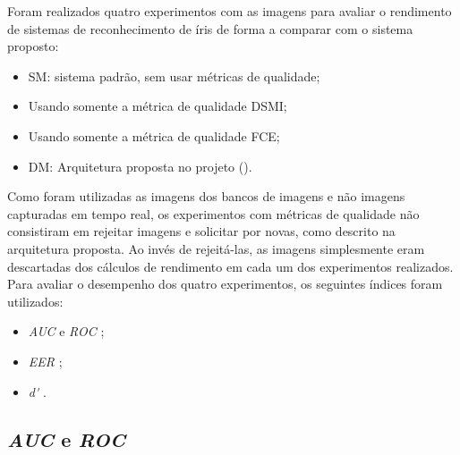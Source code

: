 

\par Foram realizados quatro experimentos com as imagens para avaliar o rendimento de sistemas de reconhecimento de íris de forma a comparar com o sistema proposto:

\begin{itemize}
    \item \acrfull{SM}: sistema padrão, sem usar métricas de qualidade;
    \item Usando somente a métrica de qualidade DSMI;
    \item Usando somente a métrica de qualidade FCE;
    \item \acrfull{DM}: Arquitetura proposta no projeto ().
\end{itemize}

\noindent Como foram utilizadas as imagens dos bancos de imagens e não imagens capturadas em tempo real, os experimentos com métricas de qualidade não consistiram em rejeitar imagens e solicitar por novas, como descrito na arquitetura proposta. Ao invés de rejeitá-las, as imagens simplesmente eram descartadas dos cálculos de rendimento em cada um dos experimentos realizados. Para avaliar o desempenho dos quatro experimentos, os seguintes índices foram utilizados:

\begin{itemize}
    \item \textit{\acrfull{AUC}} e \textit{\acrfull{ROC}} \cite{d33BEAT, aucROC, daugman2000};
    \item \textit{\acrfull{EER}} \cite{d33BEAT, eer};
    \item \textit{\acrfull{d'}} \cite{daugman2000}.
\end{itemize}

\subsection{\textit{\acrfull{AUC}} e \textit{\acrfull{ROC}}}\label{sec:experimentos:auc}


